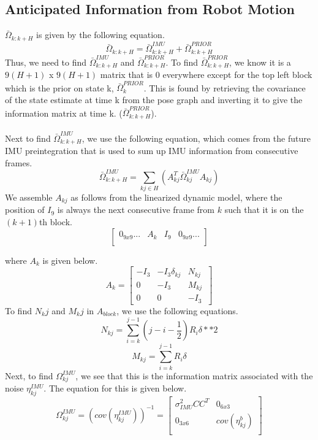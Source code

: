\subsection{Anticipated Information from Robot Motion}\label{sub:info_motion}

$\bar{\Omega}_{k:k+H}$ is given by the following equation.
\begin{equation}
    \bar{\Omega}_{k:k+H} = \bar{\Omega}_{k:k+H}^{IMU} + \bar{\Omega}_{k:k+H}^{PRIOR}
    \label{eq:omega_IMU}
\end{equation}
Thus, we need to find $\bar{\Omega}_{k:k+H}^{IMU}$ and $\bar{\Omega}_{k:k+H}^{PRIOR}$. To find $\bar{\Omega}_{k:k+H}^{PRIOR}$, we know it is a $9(H+1)$ x $9(H+1)$ matrix that is 0 everywhere except for the top left block which is the prior on state k, $\bar{\Omega}_{k}^{PRIOR}$. This is found by retrieving the covariance of the state estimate at time k from the pose graph and inverting it to give the information matrix at time k. ($\bar{\Omega}_{k:k+H}^{PRIOR}$). \\ \\
Next to find $\bar{\Omega}_{k:k+H}^{IMU}$, we use the following equation, which comes from the future IMU preintegration that is used to sum up IMU information from consecutive frames. 
\begin{equation}
    \bar{\Omega}_{k:k+H}^{IMU} = \sum_{kj \in H} (A^T_{kj}\bar{\Omega}_{kj}^{IMU}A_{kj})
\end{equation}
We assemble $A_{kj}$ as follows from the linearized dynamic model, where the position of $I_9$ is always the next consecutive frame from $k$ such that it is on the $(k+1)$th block.
\[
\begin{bmatrix}
    0_{9x9} ... & A_{k} & I_9 & 0_{9x9} ... \\
\end{bmatrix}\]

where $A_{k}$ is given below.
\[A_{k} = 
\begin{bmatrix}
-I_3 & -I_3\delta_{kj} & N_{kj} \\
0 & -I_3 & M_{kj} \\
0 & 0 & -I_3 \
\end{bmatrix}\]
To find $N_kj$ and $M_kj$ in $A_{block}$, we use the following equations. 
\begin{equation}
    N_{kj} = \sum_{i=k}^{j-1}(j-i-\frac{1}{2})R_i\delta**2
\end{equation}
\begin{equation}
    M_{kj} = \sum_{i=k}^{j-1}R_i\delta
\end{equation}
Next, to find $\Omega_{kj}^{IMU}$, we see that this is the information matrix associated with the noise $\eta_{kj}^{IMU}$. The equation for this is given below. 
\[\Omega_{kj}^{IMU} = (cov(\eta_{kj}^{IMU}))^{-1} =
\begin{bmatrix}
\sigma_{IMU}^2CC^T & 0_{6x3} \\
0_{3x6} & cov(\eta_{kj}^b) \\
\end{bmatrix}
\]

